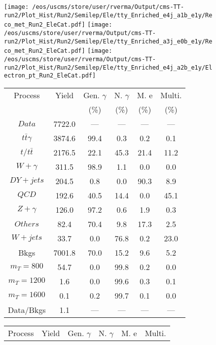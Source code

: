 \begin{figure}
\centering
\texttt{[image: /eos/uscms/store/user/rverma/Output/cms-TT-run2/Plot\_Hist/Run2/Semilep/Ele/tty\_Enriched\_e4j\_a1b\_e1y/Reco\_met\_Run2\_EleCat.pdf]}
\texttt{[image: /eos/uscms/store/user/rverma/Output/cms-TT-run2/Plot\_Hist/Run2/Semilep/Ele/tty\_Enriched\_a3j\_e0b\_e1y/Reco\_met\_Run2\_EleCat.pdf]}
\texttt{[image: /eos/uscms/store/user/rverma/Output/cms-TT-run2/Plot\_Hist/Run2/Semilep/Ele/tty\_Enriched\_e4j\_a2b\_e1y/Electron\_pt\_Run2\_EleCat.pdf]}
\begin{minipage}[c]{0.32\textwidth}
\centering
\tiny{
\begin{tabular}{cccccc}
\hline
Process & Yield & Gen. $\gamma$ & N. $\gamma$ & M. e & Multi. \\
 &  & (\%) & (\%) & (\%) & (\%)  \\
\hline
                                                                      $ Data $ &  7722.0 &  --- &  --- &  --- &  ---\\
$ t\bar{t}\gamma $ &  3874.6 &  99.4 &  0.3 &  0.2 &  0.1\\
$ t/t\bar{t} $ &  2176.5 &  22.1 &  45.3 &  21.4 &  11.2\\
$ W+\gamma $ &  311.5 &  98.9 &  1.1 &  0.0 &  0.0\\
$ DY+jets $ &  204.5 &  0.8 &  0.0 &  90.3 &  8.9\\
$ QCD $ &  192.6 &  40.5 &  14.4 &  0.0 &  45.1\\
$ Z+\gamma $ &  126.0 &  97.2 &  0.6 &  1.9 &  0.3\\
$ Others $ &  82.4 &  70.4 &  9.8 &  17.3 &  2.5\\
$ W+jets $ &  33.7 &  0.0 &  76.8 &  0.2 &  23.0\\
Bkgs &  7001.8 &  70.0 &  15.2 &  9.6 &  5.2\\
$ m_{T} = 800 $ &  54.7 &  0.0 &  99.8 &  0.2 &  0.0\\
$ m_{T} = 1200 $ &  1.6 &  0.0 &  99.6 &  0.3 &  0.1\\
$ m_{T} = 1600 $ &  0.1 &  0.2 &  99.7 &  0.1 &  0.0\\
Data/Bkgs &  1.1 &  --- &  --- &  --- &  ---\\
\hline
\end{tabular}
}
\end{minipage}
\begin{minipage}[c]{0.32\textwidth}
\centering
\tiny{
\begin{tabular}{cccccc}
\hline
Process & Yield & Gen. $\gamma$ & N. $\gamma$ & M. e & Multi. \\

\end{tabular}}
\end{minipage}
\end{figure}
